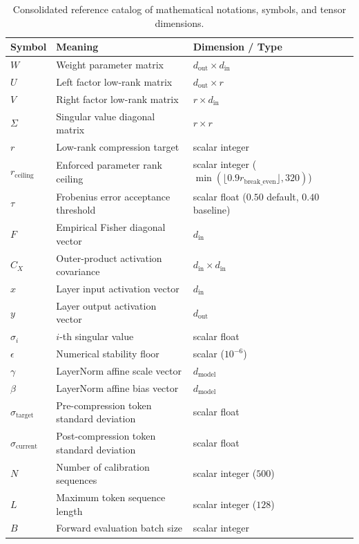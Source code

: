 \begin{table}[H]
\centering
\small
\begin{tabular}{lll}
\toprule
\textbf{Symbol} & \textbf{Meaning} & \textbf{Dimension / Type} \\
\midrule
$W$ & Weight parameter matrix & $d_\text{out} \times d_\text{in}$ \\
$U$ & Left factor low-rank matrix & $d_\text{out} \times r$ \\
$V$ & Right factor low-rank matrix & $r \times d_\text{in}$ \\
$\Sigma$ & Singular value diagonal matrix & $r \times r$ \\
$r$ & Low-rank compression target & scalar integer \\
$r_{\mathrm{ceiling}}$ & Enforced parameter rank ceiling & scalar integer ($\min(\lfloor 0.9 r_{\mathrm{break\_even}}\rfloor, 320)$) \\
$\tau$ & Frobenius error acceptance threshold & scalar float ($0.50$ default, $0.40$ baseline) \\
$F$ & Empirical Fisher diagonal vector & $d_\text{in}$ \\
$C_X$ & Outer-product activation covariance & $d_\text{in} \times d_\text{in}$ \\
$x$ & Layer input activation vector & $d_\text{in}$ \\
$y$ & Layer output activation vector & $d_\text{out}$ \\
$\sigma_i$ & $i$-th singular value & scalar float \\
$\epsilon$ & Numerical stability floor & scalar ($10^{-6}$) \\
$\gamma$ & LayerNorm affine scale vector & $d_\text{model}$ \\
$\beta$ & LayerNorm affine bias vector & $d_\text{model}$ \\
$\sigma_\text{target}$ & Pre-compression token standard deviation & scalar float \\
$\sigma_\text{current}$ & Post-compression token standard deviation & scalar float \\
$N$ & Number of calibration sequences & scalar integer ($500$) \\
$L$ & Maximum token sequence length & scalar integer ($128$) \\
$B$ & Forward evaluation batch size & scalar integer \\
\bottomrule
\end{tabular}
\caption{Consolidated reference catalog of mathematical notations, symbols, and tensor dimensions.}
\label{tab:app_notation_summary}
\end{table}